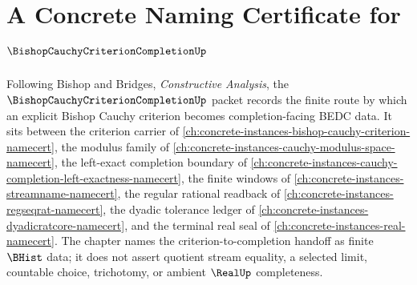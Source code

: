 \chapter{A Concrete Naming Certificate for $\BishopCauchyCriterionCompletionUp$}
\label{ch:concrete-instances-bishop-cauchy-criterion-completion-namecert}

Following Bishop and Bridges, \emph{Constructive Analysis}, the $\BishopCauchyCriterionCompletionUp$ packet records the finite route by which an explicit Bishop Cauchy criterion becomes completion-facing BEDC data. It sits between the criterion carrier of \autoref{ch:concrete-instances-bishop-cauchy-criterion-namecert}, the modulus family of \autoref{ch:concrete-instances-cauchy-modulus-space-namecert}, the left-exact completion boundary of \autoref{ch:concrete-instances-cauchy-completion-left-exactness-namecert}, the finite windows of \autoref{ch:concrete-instances-streamname-namecert}, the regular rational readback of \autoref{ch:concrete-instances-regseqrat-namecert}, the dyadic tolerance ledger of \autoref{ch:concrete-instances-dyadicratcore-namecert}, and the terminal real seal of \autoref{ch:concrete-instances-real-namecert}. The chapter names the criterion-to-completion handoff as finite $\BHist$ data; it does not assert quotient stream equality, a selected limit, countable choice, trichotomy, or ambient $\RealUp$ completeness.

